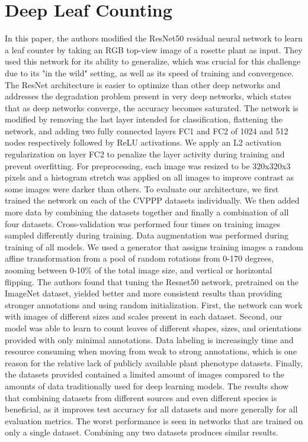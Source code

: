 \section{Deep Leaf Counting}
In this paper, the authors modified the ResNet50 residual neural network to learn a leaf counter by taking an RGB top-view image of a rosette plant as input.
They used this network for its ability to generalize, which was crucial for this challenge due to its "in the wild" setting, as well as its speed of training
and convergence. The ResNet architecture is easier to optimize than other deep networks and addresses the degradation problem present in very deep networks,
which states that as deep networks converge, the accuracy becomes saturated. The network is modified by removing the last layer intended for classification,
flattening the network, and adding two fully connected layers FC1 and FC2 of 1024 and 512 nodes respectively followed by ReLU activations. We apply an L2 activation
regularization on layer FC2 to penalize the layer activity during training and prevent overfitting. For preprocessing, each image was resized to be 320x320x3 pixels
and a histogram stretch was applied on all images to improve contrast as some images were darker than others. To evaluate our architecture, we first trained the network
on each of the CVPPP datasets individually. We then added more data by combining the datasets together and finally a combination of all four datasets.
Cross-validation was performed four times on training images sampled differently during training. Data augmentation was performed during training of all models.
We used a generator that assigns training images a random affine transformation from a pool of random rotations from 0-170 degrees, zooming between 0-10\% of the
total image size, and vertical or horizontal flipping. The authors found that tuning the Resnet50 network, pretrained on the ImageNet dataset, yielded better and
more consistent results than providing stronger annotations and using random initialization. First, the network can work with images of different sizes and scales
present in each dataset. Second, our model was able to learn to count leaves of different shapes, sizes, and orientations provided with only minimal annotations. 
Data labeling is increasingly time and resource consuming when moving from weak to strong annotations, which is one reason for the relative lack of publicly available
plant phenotype datasets. Finally, the datasets provided contained a limited amount of images compared to the amounts of data traditionally used for deep learning models.
The results show that combining datasets from different sources and even different species is beneficial, as it improves test accuracy for all datasets and more generally
for all evaluation metrics. The worst performance is seen in networks that are trained on only a single dataset. Combining any two datasets produces similar results.

